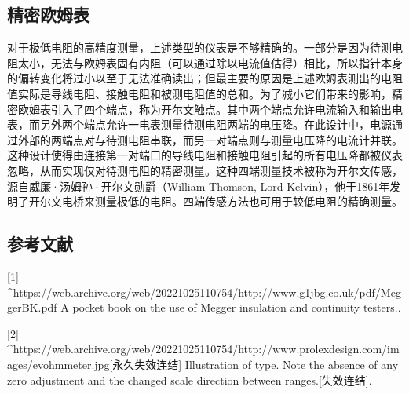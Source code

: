 \subsection{精密欧姆表}
对于极低电阻的高精度测量，上述类型的仪表是不够精确的。一部分是因为待测电阻太小，无法与欧姆表固有内阻（可以通过除以电流值估得）相比，所以指针本身的偏转变化将过小以至于无法准确读出；但最主要的原因是上述欧姆表测出的电阻值实际是导线电阻、接触电阻和被测电阻值的总和。为了减小它们带来的影响，精密欧姆表引入了四个端点，称为开尔文触点。其中两个端点允许电流输入和输出电表，而另外两个端点允许一电表测量待测电阻两端的电压降。在此设计中，电源通过外部的两端点对与待测电阻串联，而另一对端点则与测量电压降的电流计并联。这种设计使得由连接第一对端口的导线电阻和接触电阻引起的所有电压降都被仪表忽略，从而实现仅对待测电阻的精密测量。这种四端测量技术被称为开尔文传感，源自威廉·汤姆孙·开尔文勋爵（William Thomson, Lord Kelvin），他于1861年发明了开尔文电桥来测量极低的电阻。四端传感方法也可用于较低电阻的精确测量。

\subsection{参考文献}
[1]
^https://web.archive.org/web/20221025110754/http://www.g1jbg.co.uk/pdf/MeggerBK.pdf A pocket book on the use of Megger insulation and continuity testers..

[2]
^https://web.archive.org/web/20221025110754/http://www.prolexdesign.com/images/evohmmeter.jpg[永久失效连结] Illustration of type. Note the absence of any zero adjustment and the changed scale direction between ranges.[失效连结].
